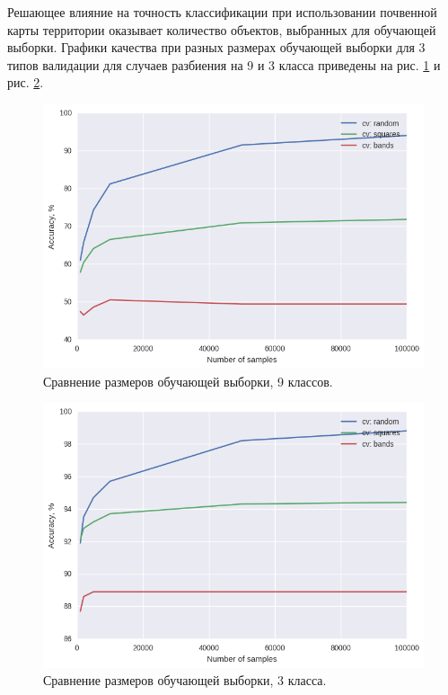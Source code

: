 \documentclass[14pt]{extarticle}
\begin{document}
\par
Решающее влияние на точность классификации при использовании почвенной карты территории оказывает
количество объектов, выбранных для обучающей выборки. Графики качества при разных
размерах обучающей выборки для 3 типов валидации для случаев разбиения на 9 и 3 класса
приведены на рис. \ref{image:map_val_9} и рис. \ref{image:map_val_3}.
\begin{figure}[H]
\centering
\includegraphics[width=\linewidth]{imgs/map_validations_9_classes.png}
\caption{Сравнение размеров обучающей выборки, 9 классов.}
\label{image:map_val_9}
\end{figure}
\begin{figure}[H]
\centering
\includegraphics[width=\linewidth]{imgs/map_validations_3_classes.png}
\caption{Сравнение размеров обучающей выборки, 3 класса.}
\label{image:map_val_3}
\end{figure}
\end{document}
